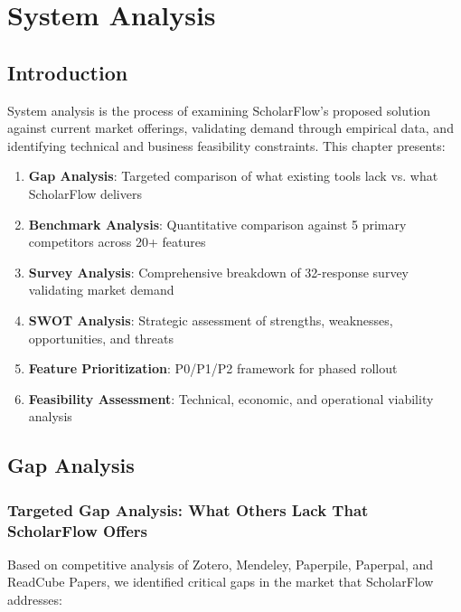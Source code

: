 \chapter{System Analysis}

\section{Introduction}

System analysis is the process of examining ScholarFlow's proposed solution against current market offerings, validating demand through empirical data, and identifying technical and business feasibility constraints. This chapter presents:

\begin{enumerate}
    \item \textbf{Gap Analysis}: Targeted comparison of what existing tools lack vs. what ScholarFlow delivers
    \item \textbf{Benchmark Analysis}: Quantitative comparison against 5 primary competitors across 20+ features
    \item \textbf{Survey Analysis}: Comprehensive breakdown of 32-response survey validating market demand
    \item \textbf{SWOT Analysis}: Strategic assessment of strengths, weaknesses, opportunities, and threats
    \item \textbf{Feature Prioritization}: P0/P1/P2 framework for phased rollout
    \item \textbf{Feasibility Assessment}: Technical, economic, and operational viability analysis
\end{enumerate}

\section{Gap Analysis}

\subsection{Targeted Gap Analysis: What Others Lack That ScholarFlow Offers}

Based on competitive analysis of Zotero, Mendeley, Paperpile, Paperpal, and ReadCube Papers, we identified critical gaps in the market that ScholarFlow addresses:

